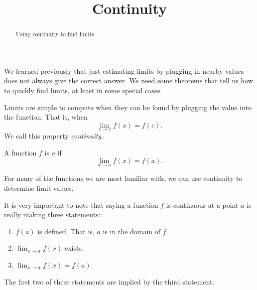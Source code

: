 \documentclass{ximera}
\title[Dig-In:]{Continuity}
\begin{document}
\begin{abstract}
Using continuity to find limits
\end{abstract}
\maketitle


We learned previously that just estimating limits by plugging in nearby values
does not always give the correct answer.  We need some theorems that
tell us how to quickly find limits, at least in some special cases.  

Limits are simple to compute when they can be found by plugging the
value into the function.  That is, when
\[
\lim_{x\to c}f(x) = f(c).
\]
We call this property \textit{continuity}.

\begin{definition}
  A function $f$ is  $a$ if
  \[
  \lim_{x\to a}f(x) = f(a).
  \]
\end{definition}

For many of the functions we are most familiar with, we can use
continuity to determine limit values.

It is very important to note that saying a function $f$ is continuous
at a point $a$ is really making three statements:
\begin{enumerate}
\item $f(a)$ is defined.  That is, $a$ is in the domain of $f$.
\item $\lim_{x\to a}f(x)$ exists.
\item $\lim_{x\to a} f(x) = f(a)$.
\end{enumerate}

The first two of these statements are implied by the third statement.
\end{document}
